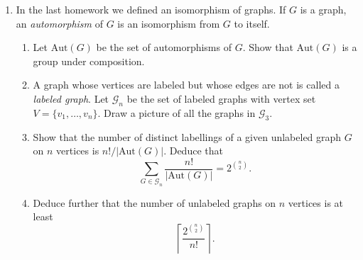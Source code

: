 \documentclass[11pt,letterpaper]{report}
\newcommand{\mcal}[1]{\mathcal{#1}}
\newcommand{\Aut}{\text{Aut}}
\begin{document}
\begin{enumerate}
	\item In the last homework we defined an isomorphism of graphs. If $G$ is a graph, an \textit{automorphism} of $G$ is an isomorphism from $G$ to itself.
	\begin{enumerate}
		\item Let $\Aut(G)$ be the set of automorphisms of $G$. Show that $\Aut(G)$ is a group under composition.
		\item A graph whose vertices are labeled but whose edges are not is called a \textit{labeled graph}. Let $\mcal{G}_n$ be the set of labeled graphs with vertex set $V = \{v_1, \ldots, v_n\}$. Draw a picture of all the graphs in $\mcal{G}_3$.
		\item Show that the number of distinct labellings of a given unlabeled graph $G$ on $n$ vertices is $n!/|\Aut(G)|$. Deduce that
		\[
		\sum_{G\in \mcal{G}_n}\frac{n!}{|\Aut(G)|} = 2^{\binom{n}{2}}.
		\]
		\item Deduce further that the number of unlabeled graphs on $n$ vertices is at least
		\[
		\left\lceil \frac{2^{\binom{n}{2}}}{n!}\right\rceil.
		\]
	\end{enumerate}
\end{enumerate}
\end{document}
